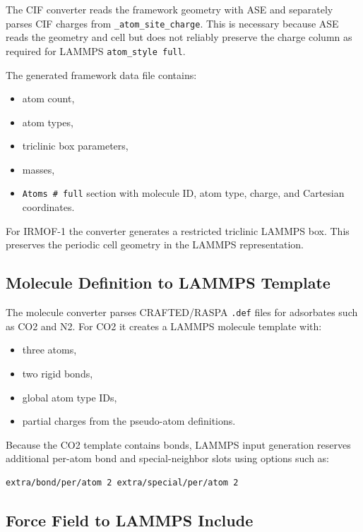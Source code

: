 \documentclass[11pt,a4paper]{article}
\begin{document}
The CIF converter reads the framework geometry with ASE and separately parses CIF charges from \texttt{\_atom\_site\_charge}.
This is necessary because ASE reads the geometry and cell but does not reliably preserve the charge column as required for LAMMPS \texttt{atom\_style full}.

The generated framework data file contains:

\begin{itemize}
    \item atom count,
    \item atom types,
    \item triclinic box parameters,
    \item masses,
    \item \texttt{Atoms \# full} section with molecule ID, atom type, charge, and Cartesian coordinates.
\end{itemize}

For IRMOF-1 the converter generates a restricted triclinic LAMMPS box.
This preserves the periodic cell geometry in the LAMMPS representation.

\subsection{Molecule Definition to LAMMPS Template}

The molecule converter parses CRAFTED/RASPA \texttt{.def} files for adsorbates such as CO2 and N2.
For CO2 it creates a LAMMPS molecule template with:

\begin{itemize}
    \item three atoms,
    \item two rigid bonds,
    \item global atom type IDs,
    \item partial charges from the pseudo-atom definitions.
\end{itemize}

Because the CO2 template contains bonds, LAMMPS input generation reserves additional per-atom bond and special-neighbor slots using options such as:

\begin{lstlisting}
extra/bond/per/atom 2 extra/special/per/atom 2
\end{lstlisting}

\subsection{Force Field to LAMMPS Include}
\end{document}
